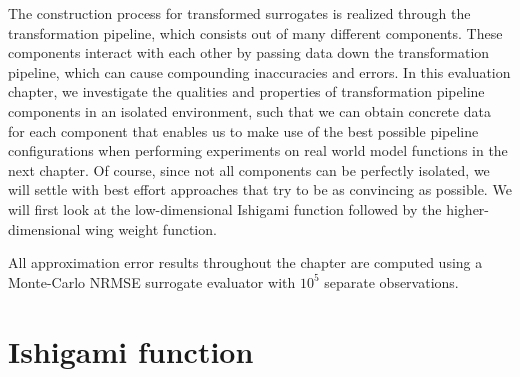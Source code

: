 \documentclass[
  a4paper,  %
  twoside,  %
  bibliography=totoc,
  headsepline,
  cleardoublepage=empty,
  parskip=half,
  draft=false
]{scrbook}
\begin{document}
The construction process for transformed surrogates is realized through the transformation pipeline, which consists out of many different components.
These components interact with each other by passing data down the transformation pipeline, which can cause compounding inaccuracies and errors.
In this evaluation chapter, we investigate the qualities and properties of transformation pipeline components in an isolated environment, such that we can obtain concrete data for each component that enables us to make use of the best possible pipeline configurations when performing experiments on real world model functions in the next chapter.
Of course, since not all components can be perfectly isolated, we will settle with best effort approaches that try to be as convincing as possible.
We will first look at the low-dimensional Ishigami function followed by the higher-dimensional wing weight function.

All approximation error results throughout the chapter are computed using a Monte-Carlo NRMSE surrogate evaluator with $10^5$ separate observations.

\section{Ishigami function}
\end{document}
